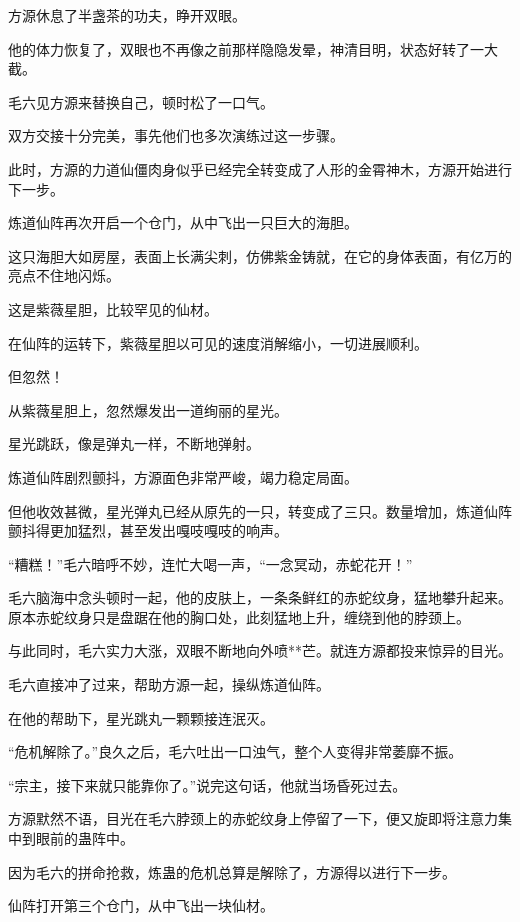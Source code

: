 
\begin{this_body}

方源休息了半盏茶的功夫，睁开双眼。

他的体力恢复了，双眼也不再像之前那样隐隐发晕，神清目明，状态好转了一大截。

毛六见方源来替换自己，顿时松了一口气。

双方交接十分完美，事先他们也多次演练过这一步骤。

此时，方源的力道仙僵肉身似乎已经完全转变成了人形的金霄神木，方源开始进行下一步。

炼道仙阵再次开启一个仓门，从中飞出一只巨大的海胆。

这只海胆大如房屋，表面上长满尖刺，仿佛紫金铸就，在它的身体表面，有亿万的亮点不住地闪烁。

这是紫薇星胆，比较罕见的仙材。

在仙阵的运转下，紫薇星胆以可见的速度消解缩小，一切进展顺利。

但忽然！

从紫薇星胆上，忽然爆发出一道绚丽的星光。

星光跳跃，像是弹丸一样，不断地弹射。

炼道仙阵剧烈颤抖，方源面色非常严峻，竭力稳定局面。

但他收效甚微，星光弹丸已经从原先的一只，转变成了三只。数量增加，炼道仙阵颤抖得更加猛烈，甚至发出嘎吱嘎吱的响声。

“糟糕！”毛六暗呼不妙，连忙大喝一声，“一念冥动，赤蛇花开！”

毛六脑海中念头顿时一起，他的皮肤上，一条条鲜红的赤蛇纹身，猛地攀升起来。原本赤蛇纹身只是盘踞在他的胸口处，此刻猛地上升，缠绕到他的脖颈上。

与此同时，毛六实力大涨，双眼不断地向外喷**芒。就连方源都投来惊异的目光。

毛六直接冲了过来，帮助方源一起，操纵炼道仙阵。

在他的帮助下，星光跳丸一颗颗接连泯灭。

“危机解除了。”良久之后，毛六吐出一口浊气，整个人变得非常萎靡不振。

“宗主，接下来就只能靠你了。”说完这句话，他就当场昏死过去。

方源默然不语，目光在毛六脖颈上的赤蛇纹身上停留了一下，便又旋即将注意力集中到眼前的蛊阵中。

因为毛六的拼命抢救，炼蛊的危机总算是解除了，方源得以进行下一步。

仙阵打开第三个仓门，从中飞出一块仙材。


\end{this_body}
